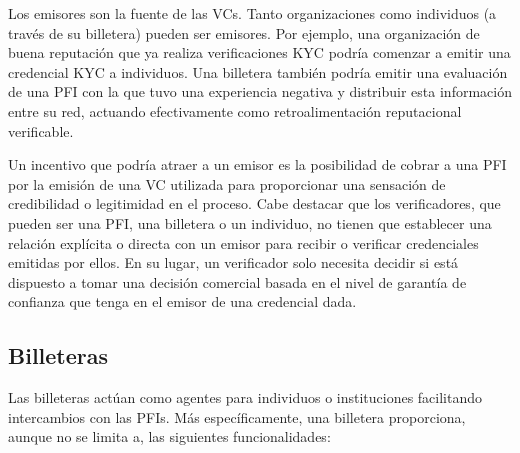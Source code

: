 \documentclass[11pt]{article}
\begin{document}
\vspace{1\baselineskip}
Los emisores son la fuente de las VCs. Tanto organizaciones como individuos (a través de su billetera) pueden ser emisores. Por ejemplo, una organización de buena reputación que ya realiza verificaciones KYC podría comenzar a emitir una credencial KYC a individuos. Una billetera también podría emitir una evaluación de una PFI con la que tuvo una experiencia negativa y distribuir esta información entre su red, actuando efectivamente como retroalimentación reputacional verificable.

\vspace{1\baselineskip}
Un incentivo que podría atraer a un emisor es la posibilidad de cobrar a una PFI por la emisión de una VC utilizada para proporcionar una sensación de credibilidad o legitimidad en el proceso. Cabe destacar que los verificadores, que pueden ser una PFI, una billetera o un individuo, no tienen que establecer una relación explícita o directa con un emisor para recibir o verificar credenciales emitidas por ellos. En su lugar, un verificador solo necesita decidir si está dispuesto a tomar una decisión comercial basada en el nivel de garantía de confianza que tenga en el emisor de una credencial dada.

\vspace{1\baselineskip}
\subsection{Billeteras}

\vspace{1\baselineskip}
Las billeteras actúan como agentes para individuos o instituciones facilitando intercambios con las PFIs. Más específicamente, una billetera proporciona, aunque no se limita a, las siguientes funcionalidades:
\end{document}
